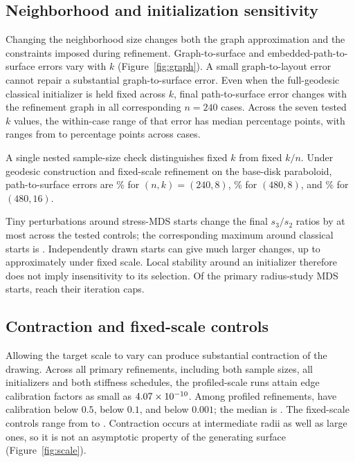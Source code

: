 \documentclass[11pt]{article}
\begin{document}
\subsection{Neighborhood and initialization sensitivity}
Changing the neighborhood size changes both the graph approximation and the
constraints imposed during refinement. Graph-to-surface and embedded-path-to-surface errors vary with $k$
(Figure~\ref{fig:graph}). A small graph-to-layout error cannot repair a
substantial graph-to-surface error. Even when the full-geodesic classical
initializer is held fixed across $k$, final path-to-surface error changes
with the refinement graph in all \numFullInitializerCases{} corresponding $n=240$ cases.
Across the seven tested $k$ values, the within-case range of that error has
median \numNeighborhoodSpreadMedian{} percentage points, with ranges from
\numNeighborhoodSpreadMin{} to \numNeighborhoodSpreadMax{} percentage points
across cases.

A single nested sample-size check distinguishes fixed $k$ from fixed $k/n$.
Under geodesic construction and fixed-scale refinement on the
base-disk paraboloid, path-to-surface errors are \numNestedBase\% for $(n,k)=(240,8)$,
\numNestedSameK\% for $(480,8)$, and \numNestedSameFraction\% for $(480,16)$.

Tiny perturbations around stress-MDS starts change the final $s_3/s_2$
ratios by at most \numStressPerturbation{} across the tested controls; the
corresponding maximum around classical starts is \numClassicalPerturbation{}.
Independently drawn starts can give much larger changes, up to approximately
\numStressRandomFixed{} under fixed scale. Local stability around an initializer
therefore does not imply insensitivity to its selection. Of the
\numRadiusStarts{} primary radius-study MDS starts, \numCappedStarts{} reach their
iteration caps.
\subsection{Contraction and fixed-scale controls}
Allowing the target scale to vary can produce substantial contraction of the
drawing. Across all primary refinements, including both sample sizes, all initializers
and both stiffness schedules, the profiled-scale runs attain edge calibration
factors as small as $4.07\times10^{-10}$. Among \numProfiledCount{} profiled
refinements, \numProfiledBelowHalf{} have calibration below $0.5$,
\numProfiledBelowTenth{} below $0.1$, and \numProfiledBelowThousandth{} below
$0.001$; the median is \numProfiledMedian{}. The fixed-scale controls range
from \numFixedMinimum{} to \numFixedMaximum{}.
Contraction occurs at intermediate radii as well as large ones, so it is not
an asymptotic property of the generating surface (Figure~\ref{fig:scale}).
\end{document}
